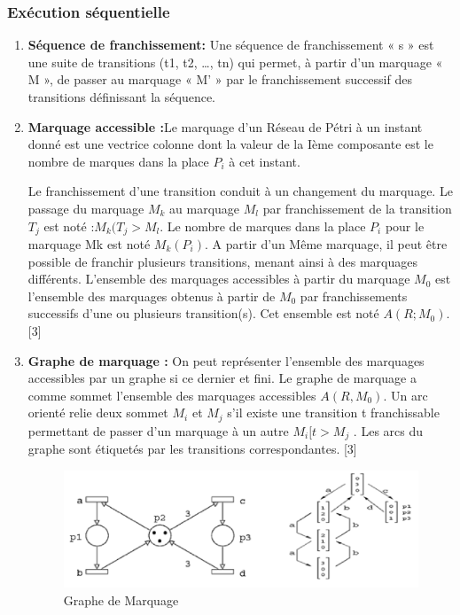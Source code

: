 \subsubsection*{Exécution séquentielle }
\begin{enumerate}
\item \textbf{Séquence de franchissement:}
 Une séquence de franchissement « s » est une suite de transitions (t1, t2, …, tn) qui permet, à partir d’un marquage « M », de passer au marquage « M’ » par le franchissement successif des transitions définissant la séquence.
  \item \textbf{Marquage accessible :}Le marquage d’un Réseau de Pétri à un instant donné est une vectrice colonne dont la valeur de la Ième composante est le nombre de marques dans la place $P_{i}$ à cet instant.
  
  
  
  Le franchissement d’une transition conduit à un changement du marquage. Le passage du marquage $M_{k}$ au marquage $M_{l}$ par franchissement de la transition $T_{j}$ est noté :$ M_{k} (T_{j } > M_{l}$. Le nombre de marques dans la place $P_{i}$ pour le marquage Mk est noté $M_{k}(P_{i})$. A partir d’un Même marquage, il peut être possible de franchir plusieurs transitions, menant ainsi à des marquages différents. L’ensemble des marquages accessibles à partir du marquage $M_{0}$ est l’ensemble des marquages obtenus à partir de $ M_{0}$ par franchissements successifs d’une ou plusieurs transition(s). Cet ensemble est noté $ A(R ; M_{0})$. [3]  
  
  \item  \textbf{Graphe de marquage :}
  On peut représenter l’ensemble des marquages accessibles par un graphe si ce dernier et fini. Le graphe de marquage  a comme sommet l’ensemble des marquages accessibles $A(R,M_{0})$. Un arc orienté relie deux sommet $M_{i}$ et $M_{j}$ s’il existe une transition t franchissable permettant de passer d’un marquage à un autre $M_{i} [t>M_{j}$ . Les arcs du graphe sont étiquetés par les transitions correspondantes. [3] 
  
  
  \begin{exmp}
   \end{exmp}
\begin{figure}[H]
	\centering
	\includegraphics[width=1\linewidth]{images/pitrif03}
	\caption{Graphe de Marquage }
	\label{fig:pitrif03}
\end{figure}


\end{enumerate}
